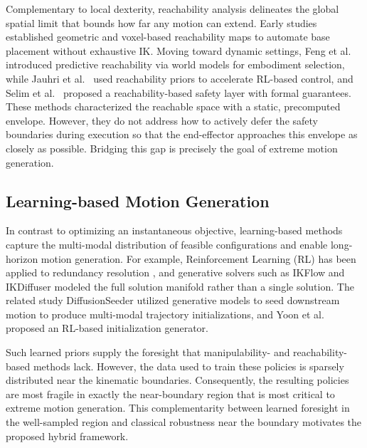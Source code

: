 \documentclass{svproc}
\begin{document}
Complementary to local dexterity, reachability analysis delineates the global spatial limit that bounds how far any motion can extend. Early studies established geometric \cite{yang2009placement} and voxel-based \cite{makhal2018reuleaux} reachability maps to automate base placement without exhaustive IK. Moving toward dynamic settings, Feng et al.~\cite{feng2025predictive} introduced predictive reachability via world models for embodiment selection, while Jauhri et al.~\cite{jauhri2022robot} used reachability priors to accelerate RL-based control, and Selim et al.~\cite{selim2022safe} proposed a reachability-based safety layer with formal guarantees. These methods characterized the reachable space with a static, precomputed envelope. However, they do not address how to actively defer the safety boundaries during execution so that the end-effector approaches this envelope as closely as possible. Bridging this gap is precisely the goal of extreme motion generation.

\subsection{Learning-based Motion Generation}
In contrast to optimizing an instantaneous objective, learning-based methods capture the multi-modal distribution of feasible configurations and enable long-horizon motion generation. For example, Reinforcement Learning (RL) has been applied to redundancy resolution \cite{malik2022deep}, and generative solvers such as IKFlow \cite{ames2022ikflow} and IKDiffuser \cite{zhang2025ikdiffuser} modeled the full solution manifold rather than a single solution. The related study DiffusionSeeder \cite{huang2024diffusionseeder} utilized generative models to seed downstream motion to produce multi-modal trajectory initializations, and Yoon et al.~\cite{yoon2023learning} proposed an RL-based initialization generator.

Such learned priors supply the foresight that manipulability- and reachability-based methods lack. However, the data used to train these policies is sparsely distributed near the kinematic boundaries. Consequently, the resulting policies are most fragile in exactly the near-boundary region that is most critical to extreme motion generation. This complementarity between learned foresight in the well-sampled region and classical robustness near the boundary motivates the proposed hybrid framework.
\end{document}
